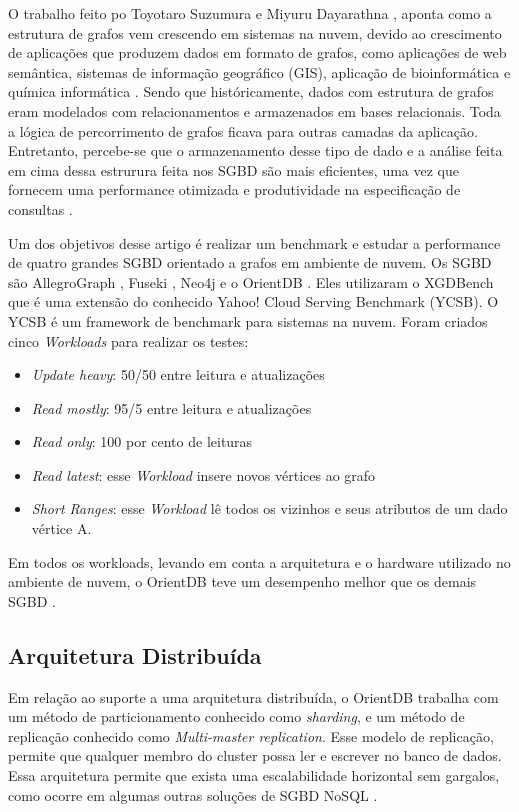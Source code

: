 	O trabalho feito po Toyotaro Suzumura e Miyuru Dayarathna \cite{dayarathna2012xgdbench}, aponta como a estrutura de grafos vem crescendo em sistemas na nuvem, devido ao crescimento de aplicações que produzem dados em formato de grafos, como aplicações de web semântica, sistemas de informação geográfico (GIS), aplicação de bioinformática \cite{dudley2010translational} e química informática \cite{ekins2010chemical}. Sendo que históricamente, dados com estrutura de grafos eram modelados com relacionamentos e armazenados em bases relacionais. Toda a lógica de percorrimento de grafos ficava para outras camadas da aplicação. Entretanto, percebe-se que o armazenamento desse tipo de dado e a análise feita em cima dessa estrurura feita nos SGBD são mais eficientes, uma vez que fornecem uma performance otimizada e produtividade na especificação de consultas \cite{dayarathna2012xgdbench}.
	
	Um dos objetivos desse artigo \cite{dayarathna2012xgdbench} é realizar um benchmark e estudar a performance de quatro grandes SGBD orientado a grafos em ambiente de nuvem. Os SGBD são AllegroGraph \cite{allegro}, Fuseki \cite{fuseki}, Neo4j \cite{neo4j-site} e o OrientDB \cite{orientdb-site}. Eles utilizaram o XGDBench que é uma extensão do conhecido Yahoo! Cloud Serving Benchmark (YCSB). O YCSB é um framework de benchmark para sistemas na nuvem. Foram criados cinco \textit{Workloads} para realizar os testes:

\begin{itemize}
	\item  \textit{Update heavy}: 50/50 entre leitura e atualizações
	\item  \textit{Read mostly}: 95/5 entre leitura e atualizações
	\item  \textit{Read only}: 100 por cento de leituras
	\item  \textit{Read latest}: esse \textit{Workload} insere novos vértices ao grafo
	\item  \textit{Short Ranges}: esse \textit{Workload} lê todos os vizinhos e seus atributos de um dado vértice A.
\end{itemize}

	Em todos os workloads, levando em conta a arquitetura e o hardware utilizado no ambiente de nuvem, o OrientDB teve um desempenho melhor que os demais SGBD \cite{dayarathna2012xgdbench}.
	
	
\subsection{Arquitetura Distribuída}
	Em relação ao suporte a uma arquitetura distribuída, o OrientDB trabalha com um método de particionamento conhecido como \textit{sharding}, e um método de replicação conhecido como \textit{Multi-master replication}. Esse modelo de replicação, permite que qualquer membro do cluster possa ler e escrever no banco de dados. Essa arquitetura permite que exista uma escalabilidade horizontal sem gargalos, como ocorre em algumas outras soluções de SGBD NoSQL \cite{kauremerging}.
	
